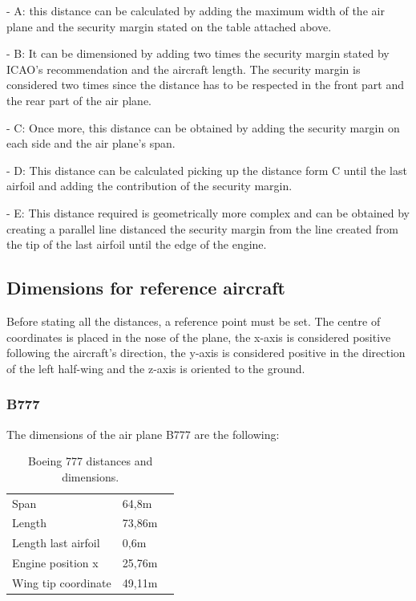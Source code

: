		- A: this distance can be calculated by adding the maximum width of the air plane and the security margin stated on the table attached above.
		
		- B: It can be dimensioned by adding two times the security margin stated by ICAO's recommendation and the aircraft length. The security margin is considered two times since the distance has to be respected in the front part and the rear part of the air plane.
		
		- C: Once more, this distance can be obtained by adding the security margin on each side and the air plane's span. 
		
		- D: This distance can be calculated picking up the distance form C until the last airfoil and adding the contribution of the security margin.
		
		- E: This distance required is geometrically more complex and can be obtained by creating a parallel line distanced the security margin from the line created from the tip of the last airfoil until the edge of the engine.   
		
		\subsection{Dimensions for reference aircraft}
		Before stating all the distances, a reference point must be set. The centre of coordinates is placed in the nose of the plane, the x-axis is considered positive following the aircraft's direction, the y-axis is considered positive in the direction of the left half-wing and the z-axis is oriented to the ground.  
		
		\subsubsection{B777}
		The dimensions of the air plane B777 are the following:
		
		\begin{table}[htb]
			\centering
			\begin{tabular}{ll p{5cm}}
				\midrule[2pt]
				Span & 64,8m\\
				Length & 73,86m\\
				Length last airfoil& 0,6m \\
				Engine position x & 25,76m\\
				Wing tip coordinate & 49,11m\\
				\bottomrule[2pt]
			\end{tabular}
			\caption{Boeing 777 distances and dimensions.}
			\label{Boeingdistances}
		\end{table}
		
